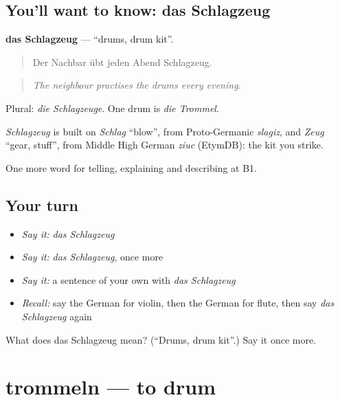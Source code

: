 \subsection*{You'll want to know: das Schlagzeug}
\textbf{das Schlagzeug} — \textquotedblleft{}drums, drum kit\textquotedblright{}.

\begin{quote}
Der Nachbar übt jeden Abend Schlagzeug.
\end{quote}

\begin{quote}
\emph{The neighbour practises the drums every evening.}
\end{quote}

Plural: \emph{die Schlagzeuge}. One drum is \emph{die Trommel}.

\begin{cousinweb}
\emph{Schlagzeug} is built on \emph{Schlag} \textquotedblleft{}blow\textquotedblright{}, from Proto-Germanic \emph{slagiz}, and \emph{Zeug} \textquotedblleft{}gear, stuff\textquotedblright{}, from Middle High German \emph{ziuc} (EtymDB): the kit you strike.
\end{cousinweb}

\begin{grammarlens}[title={What you've built}]
One more word for telling, explaining and describing at B1.
\end{grammarlens}

\subsection*{Your turn}
\begin{itemize}
\raggedright
  \item \emph{Say it:} \emph{das Schlagzeug}
  \item \emph{Say it:} \emph{das Schlagzeug}, once more
  \item \emph{Say it:} a sentence of your own with \emph{das Schlagzeug}
  \item \emph{Recall:} say the German for violin, then the German for flute, then say \emph{das Schlagzeug} again
\end{itemize}

\begin{tcolorbox}[breakable,colback=teal!4,colframe=teal!35!black,title={Before you move on}]
What does das Schlagzeug mean? (\textquotedblleft{}Drums, drum kit\textquotedblright{}.) Say it once more.
\end{tcolorbox}
\section[trommeln]{trommeln — to drum}

